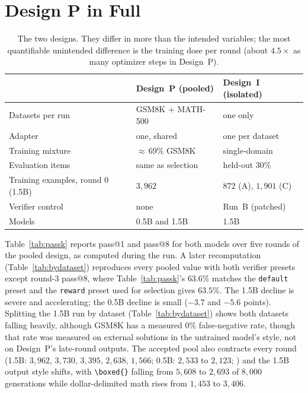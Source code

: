 \documentclass[runningheads]{llncs}
\begin{document}
\section{Design P in Full}
\label{app:pooled}

\begin{table}[t]
\caption{The two designs. They differ in more than the intended variables;
the most quantifiable unintended difference is the training dose per round
(about $4.5\times$ as many optimizer steps in Design~P).}
\label{tab:designs}
\centering
\begin{tabular}{lll}
\toprule
& Design~P (pooled) & Design~I (isolated) \\
\midrule
Datasets per run & GSM8K + MATH-500 & one only \\
Adapter & one, shared & one per dataset \\
Training mixture & $\approx$\,69\% GSM8K & single-domain \\
Evaluation items & same as selection & held-out 30\% \\
Training examples, round 0 (1.5B) & $3{,}962$ & $872$ (A), $1{,}901$ (C) \\
Verifier control & none & Run~B (patched) \\
Models & 0.5B and 1.5B & 1.5B \\
\bottomrule
\end{tabular}
\end{table}

Table~\ref{tab:passk} reports pass@1 and pass@8 for both models over five rounds
of the pooled design, as computed during the run. A later recomputation
(Table~\ref{tab:bydataset}) reproduces every pooled value with both verifier
presets except round-3 pass@8, where Table~\ref{tab:passk}'s $63.6\%$ matches
the \texttt{default} preset and the \texttt{reward} preset used for selection
gives $63.5\%$. The
1.5B decline is severe and accelerating; the 0.5B decline is small ($-3.7$ and
$-5.6$ points). Splitting the 1.5B run by dataset (Table~\ref{tab:bydataset})
shows both datasets falling heavily, although GSM8K has a measured $0\%$
false-negative rate, though that rate was measured on external solutions in
the untrained model's style, not on Design~P's late-round outputs. The accepted
pool also contracts every round (1.5B: $3{,}962$, $3{,}730$, $3{,}395$,
$2{,}638$, $1{,}566$; 0.5B: $2{,}533$ to $2{,}123$;
) and the 1.5B output style shifts, with
\verb|\boxed{}| falling from $5{,}608$ to $2{,}693$ of $8{,}000$ generations while
dollar-delimited math rises from $1{,}453$ to $3{,}406$.
\end{document}
